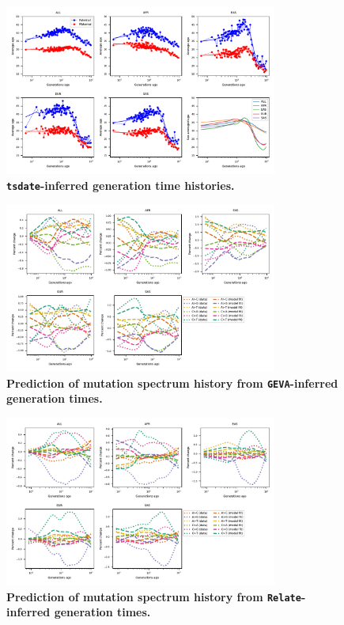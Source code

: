 \documentclass[]{article}
\newcommand{\GEVA}{\texttt{GEVA}\xspace}
\newcommand{\tsdate}{\texttt{tsdate}\xspace}
\newcommand{\relate}{\texttt{Relate}\xspace}
\begin{document}
\begin{figure}[ht!]
    \centering
    \includegraphics[width=0.8\textwidth]{../plots/inferred_generation_times.DM.tsdate.max_age.10000.pdf}
    \caption{
        \textbf{\tsdate-inferred generation time histories.}
    }
    \label{fig:tsdate-gen-times}
\end{figure}


\begin{figure}[ht!]
    \centering
    \includegraphics[width=0.8\textwidth]{../plots/goodness-of-fit.DM.geva.max_age.10000.pdf}
    \caption{
        \textbf{Prediction of mutation spectrum history from
        \GEVA-inferred generation times.}
    }
    \label{fig:geva-fit}
\end{figure}

\begin{figure}[ht!]
    \centering
    \includegraphics[width=0.8\textwidth]{../plots/goodness-of-fit.DM.relate.max_age.10000.pdf}
    \caption{
        \textbf{Prediction of mutation spectrum history from
        \relate-inferred generation times.}
    }
    \label{fig:relate-fit}
\end{figure}
\end{document}
